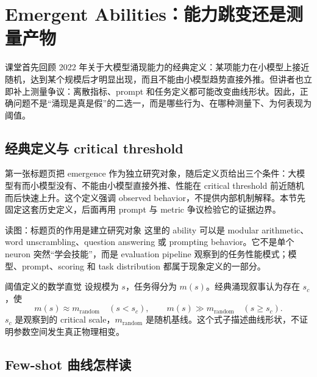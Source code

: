 \section{Emergent Abilities：能力跳变还是测量产物}

课堂首先回顾 2022 年关于大模型涌现能力的经典定义：某项能力在小模型上接近随机，达到某个规模后才明显出现，而且不能由小模型趋势直接外推。但讲者也立即补上测量争议：离散指标、prompt 和任务定义都可能改变曲线形状。因此，正确问题不是“涌现是真是假”的二选一，而是哪些行为、在哪种测量下、为何表现为阈值。

\subsection{经典定义与 critical threshold}

第一张标题页把 emergence 作为独立研究对象，随后定义页给出三个条件：大模型有而小模型没有、不能由小模型直接外推、性能在 critical threshold 前近随机而后快速上升。这个定义强调 observed behavior，不提供内部机制解释。本节先固定这套历史定义，后面再用 prompt 与 metric 争议检验它的证据边界。


\begin{knowledgebox}{读图：标题页的作用是建立研究对象}
这里的 ability 可以是 modular arithmetic、word unscrambling、question answering 或 prompting behavior。它不是单个 neuron 突然“学会技能”，而是 evaluation pipeline 观察到的任务性能模式；模型、prompt、scoring 和 task distribution 都属于现象定义的一部分。
\end{knowledgebox}


\begin{importantbox}{阈值定义的数学直觉}
设规模为 $s$，任务得分为 $m(s)$。经典涌现叙事认为存在 $s_c$，使
\[
m(s)\approx m_{\text{random}}\quad(s<s_c),\qquad
m(s)\gg m_{\text{random}}\quad(s\ge s_c).
\]
$s_c$ 是观察到的 critical scale，$m_{\text{random}}$ 是随机基线。这个式子描述曲线形状，不证明参数空间发生真正物理相变。
\end{importantbox}


\subsection{Few-shot 曲线怎样读}

